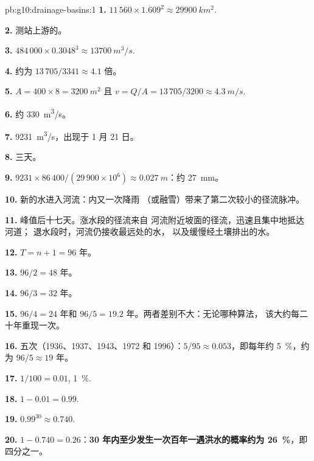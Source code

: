 \begin{solution}{pb:g10:drainage-basins:1}
\textbf{1.} $11\,560 \times 1.609^2 \approx \qty{29900}{km^2}$.

\textbf{2.} 测站上游的。

\textbf{3.} $484\,000 \times 0.3048^3 \approx \qty{13700}{m^3/s}$.

\textbf{4.} 约为 $13\,705/3341 \approx 4.1$ 倍。

\textbf{5.} $A = 400 \times 8 = \qty{3200}{m^2}$ 且 $v = Q/A = 13\,705/3200
\approx \qty{4.3}{m/s}$.

\textbf{6.} 约 \qty{330}{m^3/s}。

\textbf{7.} \qty{9231}{m^3/s}，出现于 1 月 21 日。

\textbf{8.} 三天。

\textbf{9.} $9231 \times 86\,400/(29\,900 \times 10^6) \approx
\qty{0.027}{m}$：约 \qty{27}{mm}。

\textbf{10.} 新的水进入河流：内又一次降雨
（或融雪）带来了第二次较小的径流脉冲。

\textbf{11.} 峰值后十七天。涨水段的径流来自
河流附近坡面的径流，迅速且集中地抵达河道；
退水段时，河流仍接收最远处的水，
以及缓慢经土壤排出的水。

\textbf{12.} $T = n + 1 = 96$ 年。

\textbf{13.} $96/2 = 48$ 年。

\textbf{14.} $96/3 = 32$ 年。

\textbf{15.} $96/4 = 24$ 年和 $96/5 = 19.2$ 年。两者差别不大：无论哪种算法，
该大约每二十年重现一次。

\textbf{16.} 五次（1936、1937、1943、1972 和 1996）：$5/95 \approx
0.053$，即每年约 \qty{5}{\percent}，约为
$96/5 \approx 19$ 年。

\textbf{17.} $1/100 = 0.01$, \qty{1}{\percent}.

\textbf{18.} $1 - 0.01 = 0.99$.

\textbf{19.} $0.99^{30} \approx 0.740$.

\textbf{20.} $1 - 0.740 = 0.26$：\textbf{30 年内至少发生一次百年一遇洪水的概率约为
\qty{26}{\percent}}，即四分之一。
\end{solution}
